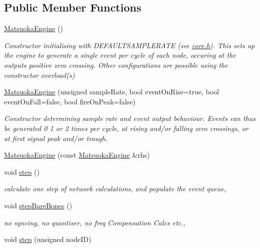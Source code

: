 \subsection*{Public Member Functions}
\begin{DoxyCompactItemize}
\item 
\mbox{\hyperlink{classMatsuokaEngine_a25f70ceddea44651433ea8547b332ecf}{Matsuoka\+Engine}} ()
\begin{DoxyCompactList}\small\item\em Constructor initialising with D\+E\+F\+A\+U\+L\+T\+S\+A\+M\+P\+L\+E\+R\+A\+TE (see \mbox{\hyperlink{core_8h}{core.\+h}}). This sets up the engine to generate a single event per cycle of each node, occuring at the outputs positive zero crossing. Other configurations are possible using the constructor overload(s) \end{DoxyCompactList}\item 
\mbox{\hyperlink{classMatsuokaEngine_a4d26cc1bf5144ea89611377701716fea}{Matsuoka\+Engine}} (unsigned sample\+Rate, bool event\+On\+Rise=true, bool event\+On\+Fall=false, bool fire\+On\+Peak=false)
\begin{DoxyCompactList}\small\item\em Constructor determining sample rate and event output behaviour. Events can thus be generated 0 1 or 2 times per cycle, at rising and/or falling zero crossings, or at first signal peak and/or trough. \end{DoxyCompactList}\item 
\mbox{\hyperlink{classMatsuokaEngine_ab0c8d7fd6eb27c8a8dae7e5fa3742ff9}{Matsuoka\+Engine}} (const \mbox{\hyperlink{classMatsuokaEngine}{Matsuoka\+Engine}} \&rhs)
\item 
void \mbox{\hyperlink{classMatsuokaEngine_a4fa468dc0814f1ad92594f7a4d5abd00}{step}} ()
\begin{DoxyCompactList}\small\item\em calculate one step of network calculations, and populate the event queue, \end{DoxyCompactList}\item 
void \mbox{\hyperlink{classMatsuokaEngine_a12519e69a1b16fe9c07717ded5249cdf}{step\+Bare\+Bones}} ()
\begin{DoxyCompactList}\small\item\em no syncing, no quantiser, no freq Compensation Calcs etc., \end{DoxyCompactList}\item 
void \mbox{\hyperlink{classMatsuokaEngine_aedf2583d11befa98a8a9d74c700635d6}{step}} (unsigned node\+ID)

\end{DoxyCompactItemize}
